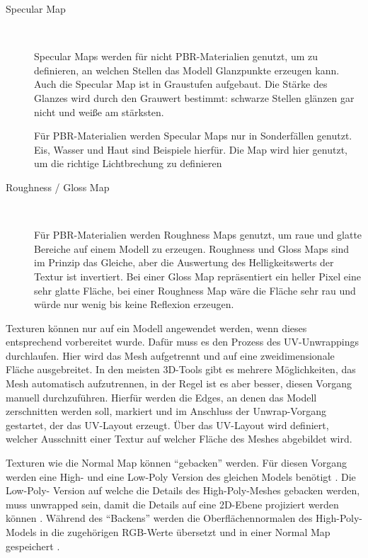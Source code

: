 \begin{description}
	\item[Specular Map]~\par
	Specular Maps werden für nicht PBR-Materialien genutzt, um zu definieren, an welchen Stellen das Modell Glanzpunkte erzeugen kann. Auch die Specular Map ist in Graustufen aufgebaut. Die Stärke des Glanzes wird durch den Grauwert bestimmt: schwarze Stellen glänzen gar nicht und weiße am stärksten. \parencite[S.\,423]{blender}
	\par
	Für PBR-Materialien werden Specular Maps nur in Sonderfällen genutzt. Eis, Wasser und Haut sind Beispiele hierfür. Die Map wird hier genutzt, um die richtige Lichtbrechung zu definieren \parencite{Jess}
	\item[Roughness / Gloss Map]~\par
	Für PBR-Materialien werden Roughness  Maps genutzt, um raue und glatte Bereiche auf einem Modell zu erzeugen. Roughness und Gloss Maps sind im Prinzip das Gleiche, aber die Auswertung des Helligkeitswerts der Textur ist invertiert. Bei einer Gloss Map repräsentiert ein heller Pixel eine sehr glatte Fläche, bei einer Roughness Map wäre die Fläche sehr rau und würde nur wenig bis keine Reflexion erzeugen. \parencite[S.\,496-497]{blender}
\end{description}
Texturen können nur auf ein Modell angewendet werden, wenn dieses entsprechend vorbereitet wurde. Dafür muss es den Prozess des UV-Unwrappings durchlaufen. Hier wird das Mesh aufgetrennt und auf eine zweidimensionale Fläche ausgebreitet. In den meisten 3D-Tools gibt es mehrere Möglichkeiten, das Mesh automatisch aufzutrennen, in der Regel ist es aber besser, diesen Vorgang manuell durchzuführen. Hierfür werden die Edges, an denen das Modell zerschnitten werden soll, markiert und im Anschluss der Unwrap-Vorgang gestartet, der das UV-Layout erzeugt. Über das UV-Layout wird definiert, welcher Ausschnitt einer Textur auf welcher Fläche des Meshes abgebildet wird. \parencite[S.\,445-455]{blender}
\par
Texturen wie die Normal Map können \enquote{gebacken} werden. Für diesen Vorgang werden eine High- und eine Low-Poly Version des gleichen Models benötigt \parencite[S.\,422]{blender}. Die Low-Poly- Version auf welche die Details des High-Poly-Meshes gebacken werden, muss unwrapped sein, damit die Details auf eine 2D-Ebene projiziert werden können \parencite[S.\,513-518]{blender}. Während des \enquote{Backens} werden die Oberflächennormalen des High-Poly-Models in die zugehörigen RGB-Werte übersetzt und in einer Normal Map gespeichert \parencite[S.\,422]{blender}.
